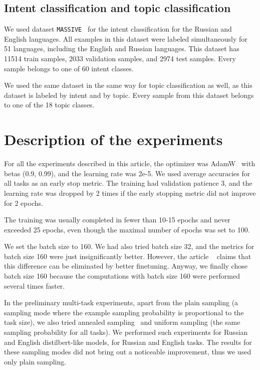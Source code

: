\subsection{Intent classification and topic classification}

We used dataset \texttt{MASSIVE}~\cite{massive} for the intent classification for the Russian and English languages. All examples in this dataset were labeled simultaneously for 51 languages, including the English and Russian languages. This dataset has 11514 train samples, 2033 validation samples, and 2974 test samples. Every sample belongs to one of 60 intent classes. 

We used the same dataset in the same way for topic classification as well, as this dataset is labeled by intent and by topic. Every sample from this dataset belongs to one of the 18 topic classes.

\section{Description of the experiments} 

For all the experiments described in this article, the optimizer was AdamW~\cite{adam} with betas (0.9, 0.99), and the learning rate was 2e-5. 
We used average accuracies for all tasks as an early stop metric. The training had validation patience 3, and the learning rate was dropped by 2 times if the early stopping metric did not improve for 2 epochs. 

The training was usually completed in fewer than 10-15 epochs and never exceeded 25 epochs, even though the maximal number of epochs was set to 100.

We set the batch size to 160. We had also tried batch size 32, and the metrics for batch size 160 were just insignificantly better. However, the article ~\cite{tuning_neural_networks} claims that this difference can be eliminated by better finetuning. Anyway, we finally chose batch size 160 because the computations with batch size 160 were performed several times faster.

In the preliminary multi-task experiments, apart from the plain sampling (a sampling mode where the example sampling probability is proportional to the task size), we also tried annealed sampling~\cite{PAL:19} and uniform sampling (the same sampling probability for all tasks). We performed such experiments for Russian and English distilbert-like models, for Russian and English tasks. The results for these sampling modes did not bring out a noticeable improvement, thus we used only plain sampling.

